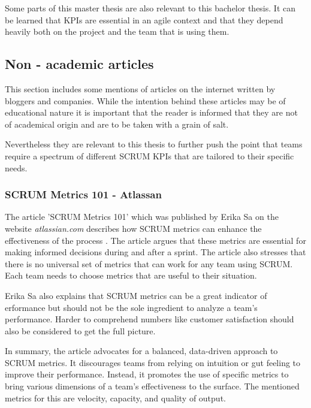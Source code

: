 Some parts of this master thesis are also relevant to this bachelor thesis.
It can be learned that KPIs are essential in an agile context and that they depend 
heavily both on the project and the team that is using them.

\subsection*{Non - academic articles}

This section includes some mentions of articles on the internet written by bloggers and companies.
While the intention behind these articles may be of educational nature it is important that the reader
is informed that they are not of academical origin and are to be taken with a grain of salt.

Nevertheless they are relevant to this thesis to further push the point that teams require a spectrum of different 
SCRUM KPIs that are tailored to their specific needs.

\subsubsection*{SCRUM Metrics 101 - Atlassan}

The article 'SCRUM Metrics 101' which was published by Erika Sa on the website 
\textit{atlassian.com} describes how SCRUM metrics can enhance the 
effectiveness of the process \parencite{Atlassian2023}. 
The article argues that these metrics are essential for making informed 
decisions during and after a sprint. 
The article also stresses that there is no universal set of 
metrics that can work for any team using SCRUM. 
Each team needs to choose metrics that are useful to their situation. 

Erika Sa also explains that SCRUM metrics can be a great indicator of 
erformance but should not be the sole ingredient to analyze a team's performance. 
Harder to comprehend numbers like customer satisfaction should also be considered to
get the full picture.

In summary, the article advocates for a balanced,
data-driven approach to SCRUM metrics. 
It discourages teams from relying on intuition or gut 
feeling to improve their performance. 
Instead, it promotes the use of specific metrics to 
bring various dimensions of a team's 
effectiveness to the surface. The mentioned metrics for 
this are velocity, capacity, and quality of output.

